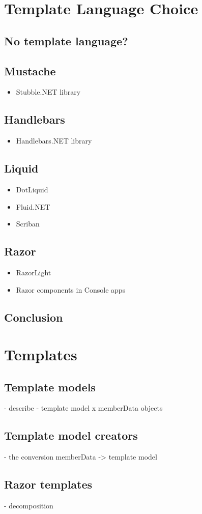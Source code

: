 \section{Template Language Choice}

\subsection{No template language?}

\subsection{Mustache}
\begin{itemize}
    \item Stubble.NET library
\end{itemize}

\subsection{Handlebars}
\begin{itemize}
    \item Handlebars.NET library
\end{itemize}

\subsection{Liquid}
\begin{itemize}
    \item DotLiquid
    \item Fluid.NET
    \item Scriban
\end{itemize}

\subsection{Razor}
\begin{itemize}
    \item RazorLight
    \item Razor components in Console apps
\end{itemize}

\subsection{Conclusion}

\section{Templates}

\subsection{Template models}
- describe
- template model x memberData objects

\subsection{Template model creators}
- the conversion memberData -> template model

\subsection{Razor templates}
- decomposition
